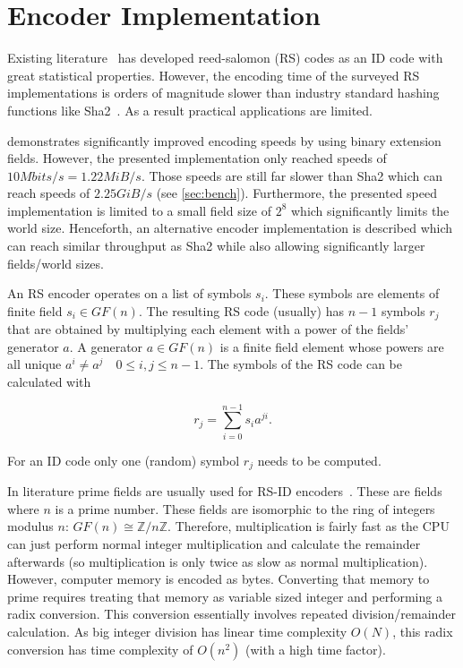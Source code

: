 \documentclass[
]{article}
\author{}
\date{}
\begin{document}
\section{Encoder Implementation}\label{encoder-implementation}

Existing literature~\cite{Lengerke2022,Lengerke2023,Ferrara2022} has developed reed-salomon (RS) codes as an ID
code with great statistical properties. However, the encoding time of
the surveyed RS implementations is orders of magnitude slower than industry standard hashing functions like Sha2~\cite{Lengerke2022,Ferrara2022}. As a result practical applications are limited.

\cite{Ferrara2022} demonstrates significantly improved encoding speeds by using binary extension fields. However, the presented implementation only reached speeds of $10Mbits/s = 1.22MiB/s$. Those speeds are still far slower than Sha2 which can reach speeds of $2.25GiB/s$ (see \cref{sec:bench}). Furthermore, the presented speed implementation is limited to a small field size of $2^{8}$ which significantly limits the world size. Henceforth, an alternative encoder implementation is described which can reach similar throughput as Sha2 while also allowing significantly larger fields/world sizes.

An RS encoder operates on a list of symbols \(s_i\). These symbols are
elements of finite field \(s_i \in GF(n)\). The resulting RS code
(usually) has \(n - 1\) symbols \(r_j\) that are obtained by multiplying
each element with a power of the fields' generator \(a\). A generator
\(a \in GF(n)\) is a finite field element whose powers
 are all unique \(a^i \neq a^j \quad 0 \le i, j \le n - 1\). The symbols of the RS
code can be calculated with

\begin{equation}
r_j = \sum_{i=0}^{n - 1} s_i a^{j i}.
\end{equation}

For an ID code only one (random) symbol $r_j$ needs to be computed.

 In literature prime fields are usually used for RS-ID encoders~\cite{Lengerke2022,Lengerke2023}. These
are fields where \(n\) is a prime number. These fields are isomorphic to
the ring of integers modulus \(n\): \(GF(n) \cong \mathbb{Z} / n\mathbb{Z}\).
Therefore, multiplication is fairly fast as the CPU can just perform
normal integer multiplication and calculate the remainder afterwards (so
multiplication is only twice as slow as normal multiplication). However,
computer memory is encoded as bytes. Converting that memory to prime requires treating that memory as  variable sized integer and performing a radix conversion. This conversion essentially involves repeated division/remainder calculation. As big integer division has linear time complexity $O(N)$, this radix conversion has time complexity of \(O(n^2)\) (with a high time factor).
\end{document}
